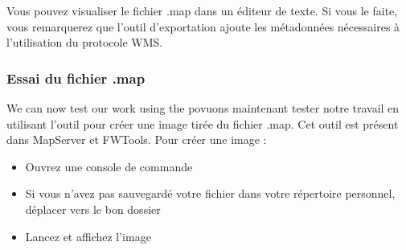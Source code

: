 
Vous pouvez visualiser le fichier .map dans un \'editeur de texte. Si vous le faite, vous remarquerez que l'outil d'exportation ajoute les m\'etadonn\'ees n\'ecessaires \`a l'utilisation du protocole WMS.

%

\subsubsection{Essai du fichier .map}

We can now test our work using the \Nus povuons maintenant tester notre travail en utilisant l'outil  pour cr\'eer une image tir\'ee du fichier .map. Cet outil est pr\'esent dans MapServer et FWTools. 
Pour cr\'eer une image :

% 

\begin{itemize}
\item Ouvrez une console de commande
\item Si vous n'avez pas sauvegard\'e votre fichier dans votre r\'epertoire personnel, d\'eplacer vers le bon dossier
\item Lancez  et affichez l'image
\end{itemize}
 
